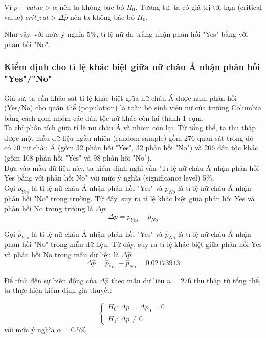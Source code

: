 \documentclass[a4paper,12pt]{article}
\begin{document}
		Vì $p-value > \alpha$ nên ta không bác bỏ $H_0$. Tương tự, ta có giá trị tới hạn (critical value) $crit\_val > \Delta\hat{p}$ nên ta không bác bỏ $H_0$. 
	
		Như vậy, với mức ý nghĩa 5\%, tỉ lệ nữ da trắng nhận phản hồi "Yes" bằng với phản hồi "No".
		
		\subsubsection{Kiểm định cho tỉ lệ khác biệt giữa nữ châu Á nhận phản hồi "Yes"/"No"}
		
			Giả sử, ta cần khảo sát tỉ lệ khác biệt giữa nữ châu Á được nam phản hồi (Yes/No) cho quần thể (population) là toàn bộ sinh viên nữ của trường Columbia bằng cách gom nhóm các dân tộc nữ khác còn lại thành 1 cụm.\\
			
			Ta chỉ phân tích giữa tỉ lệ nữ châu Á và nhóm còn lại. Từ tổng thể, ta thu thập được một mẫu dữ liệu ngẫu nhiên (random sample) gồm 276 quan sát trong đó có 70 nữ châu Á (gồm 32 phản hồi "Yes", 32 phản hồi "No") và 206 dân tộc khác (gồm 108 phản hồi "Yes" và 98 phản hồi "No").\\
			
			Dựa vào mẫu dữ liệu này, ta kiểm định nghi vấn "Tỉ lệ nữ châu Á nhận phản hồi Yes bằng với phản hồi No" với mức ý nghĩa (significance level) 5\%.\\
		
			Gọi $p_{Yes}$ là tỉ lệ nữ châu Á nhận phản hồi "Yes" và $p_{No}$ là tỉ lệ nữ châu Á nhận phản hồi "No" trong trường. Từ đây, suy ra tỉ lệ khác biệt giữa phản hồi Yes và phản hồi No trong trường là $\Delta p$: 
			$$\Delta p = p_{Yes} - p_{No}$$
			
			Gọi $\hat{p}_{Yes}$ là tỉ lệ nữ châu Á nhận phản hồi "Yes" và $\hat{p}_{No}$ là tỉ lệ nữ châu Á nhận phản hồi "No" trong mẫu dữ liệu. Từ đây, suy ra tỉ lệ khác biệt giữa phản hồi Yes và phản hồi No trong mẫu dữ liệu là $\Delta\hat{p}$:
			$$\Delta\hat{p} = \hat{p}_{Yes} - \hat{p}_{No} = 0.02173913$$
			
			Để tính đến sự biến động của $\Delta\hat{p}$ theo mẫu dữ liệu $n = 276$ thu thập từ tổng thể, ta thực hiện kiểm định giả thuyết:
			
			\begin{equation*}
			\begin{cases}
			H_0: \Delta p = \Delta p_0 = 0\\
			H_1: \Delta p \neq 0
			\end{cases}
			\end{equation*}
			với mức ý nghĩa $\alpha = 0.5\%$
			
\end{document}
